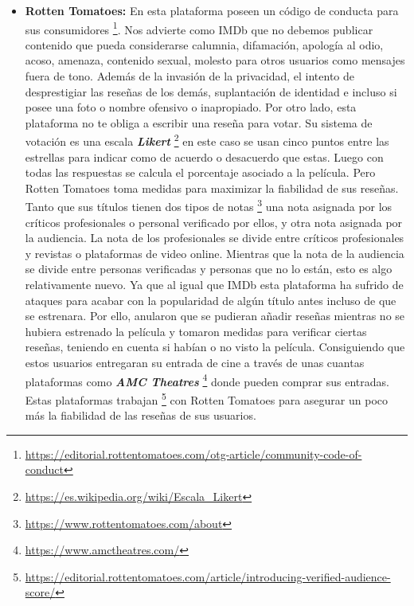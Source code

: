 \begin{itemize}
\item \textbf{Rotten Tomatoes:} En esta plataforma poseen un código de conducta para sus consumidores \footnote{\url{https://editorial.rottentomatoes.com/otg-article/community-code-of-conduct}}. Nos advierte como IMDb que no debemos publicar contenido que pueda considerarse calumnia, difamación, apología al odio, acoso, amenaza, contenido sexual, molesto para otros usuarios como mensajes fuera de tono. Además de la invasión de la privacidad, el intento de desprestigiar las reseñas de los demás, suplantación de identidad e incluso si posee una foto o nombre ofensivo o inapropiado. Por otro lado, esta plataforma no te obliga a escribir una reseña para votar. Su sistema de votación es una escala \textbf{\textit{Likert}} \footnote{\url{https://es.wikipedia.org/wiki/Escala_Likert}} en este caso se usan cinco puntos entre las estrellas para indicar como de acuerdo o desacuerdo que estas. Luego con todas las respuestas se calcula el porcentaje asociado a la película. Pero Rotten Tomatoes toma medidas para maximizar la fiabilidad de sus reseñas. Tanto que sus títulos tienen dos tipos de notas \footnote{\url{https://www.rottentomatoes.com/about}} una nota asignada por los críticos profesionales o personal verificado por ellos, y otra nota asignada por la audiencia. La nota de los profesionales se divide entre críticos profesionales y revistas o plataformas de video online. Mientras que la nota de la audiencia se divide entre personas verificadas y personas que no lo están, esto es algo relativamente nuevo. Ya que al igual que IMDb esta plataforma ha sufrido de ataques para acabar con la popularidad de algún título antes incluso de que se estrenara. Por ello, anularon que se pudieran añadir reseñas mientras no se hubiera estrenado la película y tomaron medidas para verificar ciertas reseñas, teniendo en cuenta si habían o no visto la película. Consiguiendo que estos usuarios entregaran su entrada de cine a través de unas cuantas plataformas como  \textbf{\textit{AMC Theatres}} \footnote{\url{https://www.amctheatres.com/}} donde pueden comprar sus entradas. Estas plataformas trabajan \footnote{\url{https://editorial.rottentomatoes.com/article/introducing-verified-audience-score/}} con Rotten Tomatoes para asegurar un poco más la fiabilidad de las reseñas de sus usuarios.

\end{itemize}
